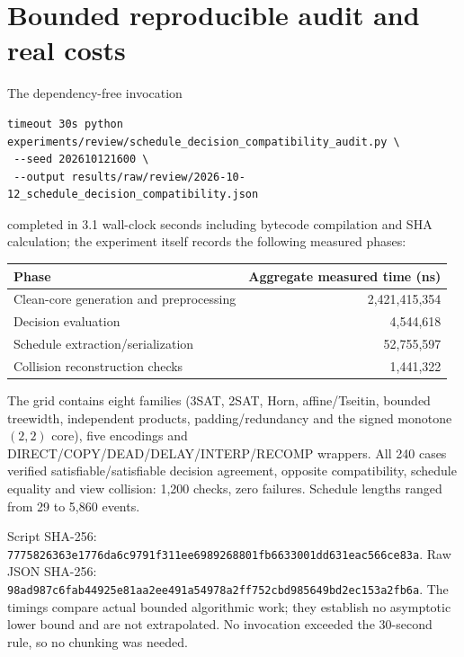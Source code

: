 \documentclass[11pt]{article}
\begin{document}
\section{Bounded reproducible audit and real costs}
The dependency-free invocation
\begin{verbatim}
timeout 30s python experiments/review/schedule_decision_compatibility_audit.py \
 --seed 202610121600 \
 --output results/raw/review/2026-10-12_schedule_decision_compatibility.json
\end{verbatim}
completed in 3.1 wall-clock seconds including bytecode compilation and SHA
calculation; the experiment itself records the following measured phases:
\begin{center}\small
\begin{tabular}{@{}lr@{}}\toprule
Phase & Aggregate measured time (ns)\\ \midrule
Clean-core generation and preprocessing & 2,421,415,354\\
Decision evaluation & 4,544,618\\
Schedule extraction/serialization & 52,755,597\\
Collision reconstruction checks & 1,441,322\\ \bottomrule
\end{tabular}
\end{center}
The grid contains eight families (3SAT, 2SAT, Horn, affine/Tseitin,
bounded treewidth, independent products, padding/redundancy and the signed
monotone $(2,2)$ core), five encodings and DIRECT/COPY/DEAD/DELAY/INTERP/RECOMP
wrappers.  All 240 cases verified satisfiable/satisfiable decision agreement,
opposite compatibility, schedule equality and view collision: 1,200 checks,
zero failures.  Schedule lengths ranged from 29 to 5,860 events.

Script SHA-256:
\nolinkurl{7775826363e1776da6c9791f311ee6989268801fb6633001dd631eac566ce83a}.
Raw JSON SHA-256:
\nolinkurl{98ad987c6fab44925e81aa2ee491a54978a2ff752cbd985649bd2ec153a2fb6a}.
The timings compare actual bounded algorithmic work; they establish no
asymptotic lower bound and are not extrapolated.  No invocation exceeded the
30-second rule, so no chunking was needed.
\end{document}
